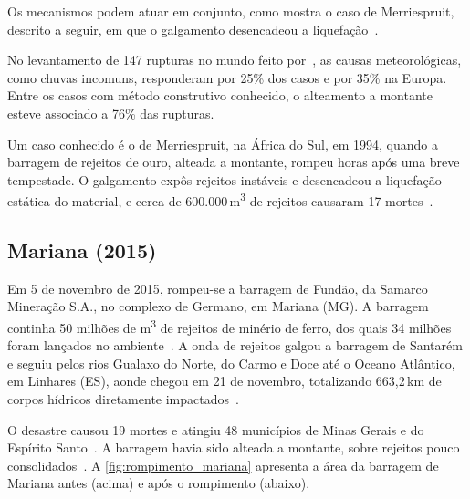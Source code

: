 Os mecanismos podem atuar em conjunto, como mostra o caso de
Merriespruit, descrito a seguir, em que o galgamento desencadeou a
liquefação~\cite{fourie2001static}.

No levantamento de 147 rupturas no mundo feito por~, as causas meteorológicas, como
chuvas incomuns, responderam por 25\% dos casos e por 35\% na Europa.
Entre os casos com método construtivo conhecido, o alteamento a
montante esteve associado a 76\% das rupturas.

Um caso conhecido é o de Merriespruit, na África do Sul, em 1994, quando a barragem de rejeitos de ouro, alteada a montante, rompeu horas após uma
breve tempestade. O galgamento expôs rejeitos instáveis e desencadeou a
liquefação estática do material, e cerca de 600.000\,m\textsuperscript{3} de rejeitos causaram 17 mortes~\cite[p.~707--709]{fourie2001static}.

\subsection{Mariana (2015)}
\label{subsec:mariana}

Em 5 de novembro de 2015, rompeu-se a barragem de Fundão, da Samarco
Mineração S.A., no complexo de Germano, em Mariana (MG). A barragem
continha 50 milhões de m\textsuperscript{3} de rejeitos de minério de
ferro, dos quais 34 milhões foram lançados no ambiente~\cite[p.~3]{ibama2015laudo}.
A onda de rejeitos galgou a barragem de Santarém e seguiu pelos rios
Gualaxo do Norte, do Carmo e Doce até o Oceano Atlântico, em Linhares
(ES), aonde chegou em 21 de novembro, totalizando 663,2\,km de corpos
hídricos diretamente impactados~\cite[p.~3]{ibama2015laudo}.

O desastre causou 19 mortes e atingiu 48 municípios de Minas Gerais e do
Espírito Santo~\cite{agenciaminas2024mariana}. A barragem havia sido
alteada a montante, sobre rejeitos pouco consolidados~\cite{estadominas2016irregular}. A \autoref{fig:rompimento_mariana} apresenta a área da barragem de Mariana antes (acima) e após o rompimento (abaixo).

